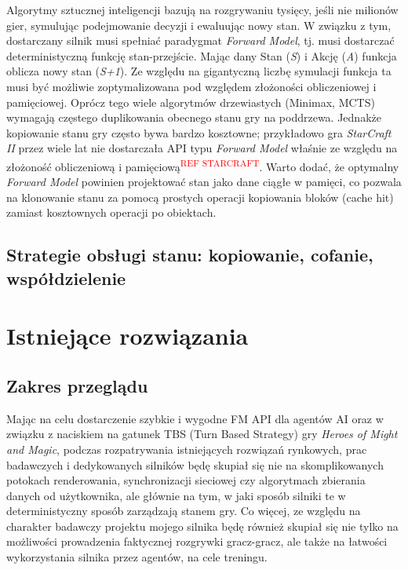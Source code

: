 \documentclass[
    bindingoffset=5mm,
    footnoteindent=3mm,
    hyphenation=true
]{src/wut-thesis}
\newcommand{\refneeded}[1]{\textsuperscript{\textcolor{red}{#1}}}
\begin{document}
Algorytmy sztucznej inteligencji bazują na rozgrywaniu tysięcy, jeśli nie milionów gier,
symulując podejmowanie decyzji i ewaluując nowy stan. W związku z tym, dostarczany
silnik musi spełniać paradygmat \emph{Forward Model}, tj. musi dostarczać deterministyczną
funkcję stan-przejście. Mając dany Stan (\emph{S}) i Akcję (\emph{A}) funkcja oblicza nowy stan
(\emph{S+1}). Ze względu na gigantyczną liczbę symulacji funkcja ta musi być możliwie
zoptymalizowana pod względem złożoności obliczeniowej i pamięciowej. Oprócz tego
wiele algorytmów drzewiastych (Minimax, MCTS) wymagają częstego duplikowania
obecnego stanu gry na poddrzewa. Jednakże kopiowanie stanu gry często bywa
bardzo kosztowne; przykładowo gra \emph{StarCraft II} przez wiele lat nie dostarczała API
typu \emph{Forward Model} właśnie ze względu na złożoność obliczeniową i pamięciową\refneeded{REF STARCRAFT}.
Warto dodać, że optymalny \emph{Forward Model} powinien projektować stan jako
dane ciągłe w pamięci, co pozwala na klonowanie stanu za pomocą prostych operacji
kopiowania bloków (cache hit) zamiast kosztownych operacji po obiektach.

\subsection{Strategie obsługi stanu: kopiowanie, cofanie, współdzielenie}

\clearpage
\section{Istniejące rozwiązania}

\subsection{Zakres przeglądu}

Mając na celu dostarczenie szybkie i wygodne FM API dla agentów AI oraz w związku
z naciskiem na gatunek TBS (Turn Based Strategy) gry \emph{Heroes of Might and Magic},
podczas rozpatrywania istniejących rozwiązań rynkowych, prac badawczych i
dedykowanych silników będę skupiał się nie na skomplikowanych potokach
renderowania, synchronizacji sieciowej czy algorytmach zbierania danych od
użytkownika, ale głównie na tym, w jaki sposób silniki te w deterministyczny sposób
zarządzają stanem gry. Co więcej, ze względu na charakter badawczy projektu mojego
silnika będę również skupiał się nie tylko na możliwości prowadzenia faktycznej
rozgrywki gracz-gracz, ale także na łatwości wykorzystania silnika przez agentów, na
cele treningu.
\end{document}

